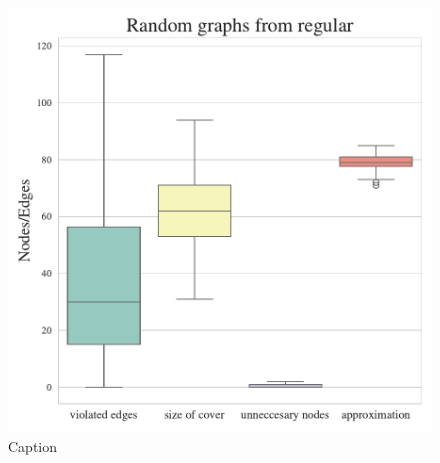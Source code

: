 \begin{figure}[h]
    \centering
    \includegraphics[width=\linewidth]{Project2TSP/_src/figures/mvc_regular_to_random.pdf}
    \caption{Caption}
    \label{fig:mvc_regular_to_random}
\end{figure}